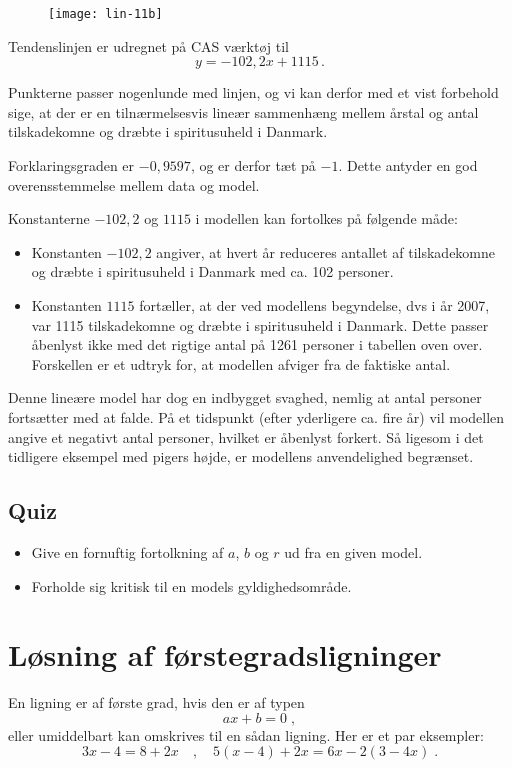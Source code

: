 \documentclass[12pt,oneside,a4paper]{article}
\begin{document}
\begin{figure}[H]
    \centering
    \texttt{[image: lin-11b]}
    \caption{}
\end{figure}

Tendenslinjen er udregnet på CAS værktøj til
\[
    y=-102,2x+1115 \,.
\]

Punkterne passer nogenlunde med linjen, og vi kan derfor med et vist forbehold
sige, at der er en tilnærmelsesvis lineær sammenhæng mellem årstal og antal
tilskadekomne og dræbte i spiritusuheld i Danmark.

Forklaringsgraden er $-0,9597$, og er derfor tæt på $-1$. Dette antyder en
god overensstemmelse mellem data og model.

Konstanterne $-102,2$ og $1115$ i modellen kan fortolkes på følgende måde:
\begin{itemize}
    \item Konstanten $-102,2$ angiver, at hvert år reduceres antallet af
        tilskadekomne og dræbte i spiritusuheld i Danmark med ca. 102 personer.
    \item Konstanten $1115$ fortæller, at der ved modellens begyndelse, dvs i
        år 2007, var 1115 tilskadekomne og dræbte i spiritusuheld i Danmark.
        Dette passer åbenlyst ikke med det rigtige antal på 1261 personer i
        tabellen oven over. Forskellen er et udtryk for, at modellen afviger
        fra de faktiske antal.
\end{itemize}

Denne lineære model har dog en indbygget svaghed, nemlig at antal personer
fortsætter med at falde.  På et tidspunkt (efter yderligere ca. fire år) vil
modellen angive et negativt antal personer, hvilket er åbenlyst forkert. Så
\mbox{ligesom} i det tidligere eksempel med pigers højde, er modellens
anvendelighed begrænset.

\subsection{Quiz}
\begin{itemize}
    \item Give en fornuftig fortolkning af $a$, $b$ og $r$ ud fra en given
        model.
    \item Forholde sig kritisk til en models gyldighedsområde.
\end{itemize}


\section{Løsning af førstegradsligninger}
En ligning er af første grad, hvis den er af typen
$$
ax + b = 0\; ,
$$
eller umiddelbart kan omskrives til en sådan ligning. Her er et par eksempler:
$$
3x - 4 = 8 + 2x \quad , \quad 5(x - 4) + 2x = 6x - 2(3 - 4x)\; .
$$
\end{document}
